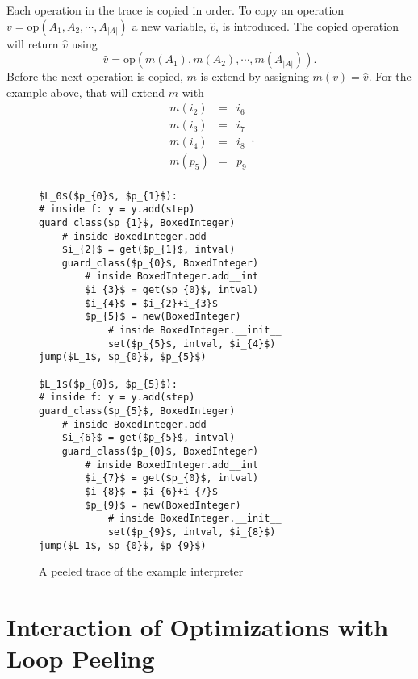 \documentclass[preprint]{sigplanconf}
\begin{document}
Each operation in the trace is copied in order.
To copy an operation $v=\text{op}\left(A_1, A_2, \cdots, A_{|A|}\right)$
a new variable, $\hat v$, is introduced. The copied operation will
return $\hat v$ using
\begin{equation}
  \hat v = \text{op}\left(m\left(A_1\right), m\left(A_2\right), 
    \cdots, m\left(A_{|A|}\right)\right) . 
\end{equation}
Before the
next operation is copied, $m$ is extend by assigning $m\left(v\right) = \hat
v$. For the example above, that will extend $m$ with
\begin{equation}
    \begin{array}{lcl}
      m\left(i_2\right) &=& i_6 \\
      m\left(i_3\right) &=& i_7 \\
      m\left(i_4\right) &=& i_8 \\
      m\left(p_5\right) &=& p_9 \\
    \end{array}
  .
\end{equation}

\begin{figure}
\begin{lstlisting}[mathescape,numbers = right,basicstyle=\setstretch{1.05}\ttfamily\scriptsize]
$L_0$($p_{0}$, $p_{1}$):
# inside f: y = y.add(step)
guard_class($p_{1}$, BoxedInteger)
    # inside BoxedInteger.add
    $i_{2}$ = get($p_{1}$, intval)
    guard_class($p_{0}$, BoxedInteger)
        # inside BoxedInteger.add__int
        $i_{3}$ = get($p_{0}$, intval)
        $i_{4}$ = $i_{2}+i_{3}$
        $p_{5}$ = new(BoxedInteger)
            # inside BoxedInteger.__init__
            set($p_{5}$, intval, $i_{4}$)
jump($L_1$, $p_{0}$, $p_{5}$)

$L_1$($p_{0}$, $p_{5}$):
# inside f: y = y.add(step)
guard_class($p_{5}$, BoxedInteger)
    # inside BoxedInteger.add
    $i_{6}$ = get($p_{5}$, intval)
    guard_class($p_{0}$, BoxedInteger)
        # inside BoxedInteger.add__int
        $i_{7}$ = get($p_{0}$, intval)
        $i_{8}$ = $i_{6}+i_{7}$
        $p_{9}$ = new(BoxedInteger)
            # inside BoxedInteger.__init__
            set($p_{9}$, intval, $i_{8}$)
jump($L_1$, $p_{0}$, $p_{9}$)
\end{lstlisting}
\caption{A peeled trace of the example interpreter}
\label{fig:peeled-trace}
\end{figure}

\section{Interaction of Optimizations with Loop Peeling}
\end{document}
